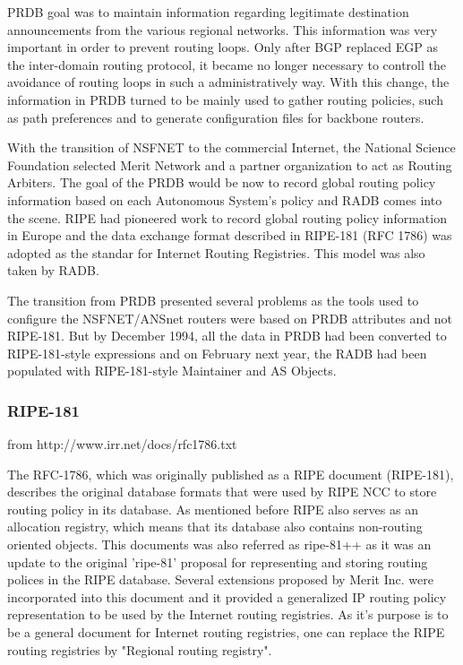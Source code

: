 \documentclass[11pt,a4paper]{scrreprt}
\begin{document}
PRDB goal was to maintain information regarding legitimate destination announcements from the various regional networks. This information was very important in order to prevent routing loops. Only after BGP replaced EGP as the inter-domain routing protocol, it became no longer necessary to controll the avoidance of routing loops in such a administratively way. With this change, the information in PRDB turned to be mainly used to gather routing policies, such as path preferences and to generate configuration files for backbone routers.

With the transition of NSFNET to the commercial Internet, the National Science Foundation selected Merit Network and a partner organization to act as Routing Arbiters. The goal of the PRDB would be now to record global routing policy information based on each Autonomous System's policy and RADB comes into the scene. RIPE had pioneered work to record global routing policy information in Europe and the data exchange format described in RIPE-181 (RFC 1786) was adopted as the standar for Internet Routing Registries. This model was also taken by RADB. 

The transition from PRDB presented several problems as the tools used to configure the NSFNET/ANSnet routers were based on PRDB attributes and not RIPE-181. But by December 1994, all the data in PRDB had been converted to RIPE-181-style expressions and on February next year, the RADB had been populated with RIPE-181-style Maintainer and AS Objects. 

\subsubsection{RIPE-181}
from http://www.irr.net/docs/rfc1786.txt


The RFC-1786, which was originally published as a RIPE document (RIPE-181), describes the original database formats that were used by RIPE NCC to store routing policy in its database. As mentioned before RIPE also serves as an allocation registry, which means that its database also contains non-routing oriented objects. 
This documents was also referred as ripe-81++ as it was an update to the original 'ripe-81' proposal for representing and storing routing polices in the RIPE database. Several extensions proposed by Merit Inc. were incorporated into this document and it provided a generalized IP routing policy representation to be used by the Internet routing registries. As it's purpose is to be a general document for Internet routing registries, one can replace the RIPE routing registries by "Regional routing registry".
\end{document}
